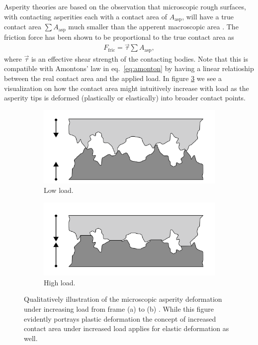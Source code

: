 Asperity theories are based on the observation that microscopic rough surfaces,
with contacting asperities each with a contact area of $A_{\text{asp}}$, will
have a true contact area $\sum A_{\text{asp}}$ much smaller than the apperent
macroscopic area \cite{kim_nano-scale_2009}. The friction
force has been shown to be proportional to the true contact area as 
\begin{align*}
  F_\text{fric} = \vec{\tau} \sum A_{\text{asp}},
\end{align*}
where $\vec{\tau}$ is an effective shear strength of the contacting bodies. Note
that this is compatible with Amontons’ law in eq.~\eqref{eq:amonton} by having a linear relatioship between the real contact area and the
applied load. In figure \ref{fig:asperity_contact} we see a
visualization on how the contact area might intuitively increase with load as the asperity tips is deformed (plastically or elastically) into broader contact points.
\begin{figure}[H]
  \centering
  \begin{subfigure}[b]{0.49\textwidth}
      \centering
      \includegraphics[width=\textwidth]{figures/theory/asperities_top.png}
      \caption{Low load.}
      \label{fig:asp_left}
  \end{subfigure}
  \hfill
  \begin{subfigure}[b]{0.49\textwidth}
      \centering
      \includegraphics[width=\textwidth]{figures/theory/asperities_bottom.png}
      \caption{High load.}
      \label{fig:asp_right}
  \end{subfigure}
  \hfill
     \caption{Qualitatively illustration of the microscopic asperity deformation
     under increasing load from frame (a) to (b) \cite{wiki:asperities}. While this figure evidently portrays plastic deformation the concept of increased contact area under increased load applies for elastic deformation as well.}
     \label{fig:asperity_contact}
\end{figure}

